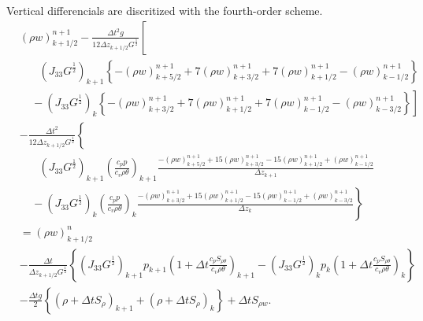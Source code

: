 Vertical differencials are discritized with the fourth-order scheme.
\begin{align}
&
  (\rho w)_{k+1/2}^{n+1}
  -\frac{\Delta t^2 g}{12\Delta z_{k+1/2} G^{\frac{1}{2}}}
  \left[\right. \nonumber\\ & \left.\:\:\:\:\:\:\:\:
       (J_{33}G^{\frac{1}{2}})_{k+1}\left\{-(\rho w)_{k+5/2}^{n+1}+7(\rho w)^{n+1}_{k+3/2}+7(\rho w)^{n+1}_{k+1/2}-(\rho w)^{n+1}_{k-1/2}\right\}\right. \nonumber\\ & \left.\:\:\:\:\:
      -(J_{33}G^{\frac{1}{2}})_k\left\{-(\rho w)^{n+1}_{k+3/2}+7(\rho w)^{n+1}_{k+1/2}+7(\rho w)^{n+1}_{k-1/2}-(\rho w)^{n+1}_{k-3/2}\right\} \right]
    \nonumber\\ &
  - \frac{\Delta t^2}{12\Delta z_{k+1/2} G^{\frac{1}{2}}}\left\{\right. \nonumber\\ & \left.\:\:\:\:\:\:\:\:
  (J_{33}G^{\frac{1}{2}})_{k+1}\left(\frac{c_pp}{c_v\rho\theta}\right)_{k+1}\frac{-(\rho w)^{n+1}_{k+5/2}+15(\rho w)^{n+1}_{k+3/2}-15(\rho w)^{n+1}_{k+1/2}+(\rho w)^{n+1}_{k-1/2}}{\Delta z_{k+1}}
  \right. \nonumber\\ & \left.\:\:\:\:\:
  -(J_{33}G^{\frac{1}{2}})_k\left(\frac{c_pp}{c_v\rho\theta}\right)_k\frac{-(\rho w)_{k+3/2}^{n+1}+15(\rho w)_{k+1/2}^{n+1}-15(\rho w)_{k-1/2}^{n+1}+(\rho w)_{k-3/2}^{n+1}}{\Delta z_k} \right\} \nonumber\\
  &=
  (\rho w)_{k+1/2}^n \nonumber\\&
  -\frac{\Delta t}{\Delta z_{k+1/2} G^{\frac{1}{2}}} \left\{
  (J_{33}G^{\frac{1}{2}})_{k+1} p_{k+1}\left(1+\Delta t\frac{c_pS_{\rho\theta}}{c_v\rho\theta}\right)_{k+1}
  - (J_{33}G^{\frac{1}{2}})_k p_k\left(1+\Delta t\frac{c_pS_{\rho\theta}}{c_v\rho\theta}\right)_k \right\}\nonumber\\ &
  -\frac{\Delta t g}{2} \left\{ (\rho+\Delta t S_\rho)_{k+1}+(\rho+\Delta t S_\rho)_k\right\} + \Delta t S_{\rho w}.
\end{align}

